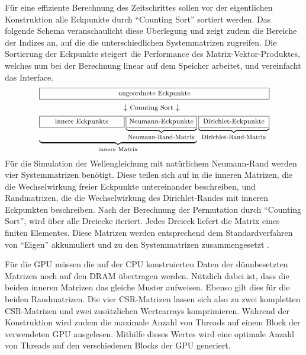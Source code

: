 \documentclass[crop=false,10pt,ngerman]{standalone}
\begin{document}
      Für eine effiziente Berechnung des Zeitschrittes sollen vor der eigentlichen Konstruktion alle Eckpunkte durch \enquote{Counting Sort} sortiert werden.
      Das folgende Schema veranschaulicht diese Überlegung und zeigt zudem die Bereiche der Indizes an, auf die die unterschiedlichen Systemmatrizen zugreifen.
      Die Sortierung der Eckpunkte steigert die Performance des Matrix-Vektor-Produktes, welches nun bei der Berechnung linear auf dem Speicher arbeitet, und vereinfacht das Interface.
      \begin{align*}
        &\,\framebox[0.81\textwidth]{\footnotesize ungeordnete Eckpunkte} \\
        &\makebox[0.81\textwidth]{\hfill $\downarrow \text{\footnotesize Counting Sort} \downarrow$ \hfill}\\
        & \underbrace{\framebox[0.3\textwidth]{\footnotesize innere Eckpunkte}\underbrace{\framebox[0.25\textwidth]{\footnotesize Neumann-Eckpunkte}}_{\text{Neumann-Rand-Matrix}}}_{\text{innere Matrix}} \underbrace{\framebox[0.25\textwidth]{\footnotesize Dirichlet-Eckpunkte}}_{\text{Dirichlet-Rand-Matrix}}
      \end{align*}
      Für die Simulation der Wellengleichung mit natürlichem Neumann-Rand werden vier Systemmatrizen benötigt.
      Diese teilen sich auf in die inneren Matrizen, die die Wechselwirkung freier Eckpunkte untereinander beschreiben, und Randmatrizen, die die Wechselwirkung des Dirichlet-Randes mit inneren Eckpunkten beschreiben.
      Nach der Berechnung der Permutation durch \enquote{Counting Sort}, wird über alle Dreiecke iteriert.
      Jedes Dreieck liefert die Matrix eines finiten Elementes.
      Diese Matrizen werden entsprechend dem Standardverfahren von \enquote{Eigen} akkumuliert und zu den Systemmatrizen zusammengesetzt \cite{Eigen2018}.

      Für die GPU müssen die auf der CPU konstruierten Daten der dünnbesetzten Matrizen noch auf den DRAM übertragen werden.
      Nützlich dabei ist, dass die beiden inneren Matrizen das gleiche Muster aufweisen.
      Ebenso gilt dies für die beiden Randmatrizen.
      Die vier CSR-Matrizen lassen sich also zu zwei kompletten CSR-Matrizen und zwei zusätzlichen Wertearrays komprimieren.
      Während der Konstruktion wird zudem die maximale Anzahl von Threads auf einem Block der verwendeten GPU ausgelesen.
      Mithilfe dieses Wertes wird eine optimale Anzahl von Threads auf den verschiedenen Blocks der GPU generiert.
\end{document}
